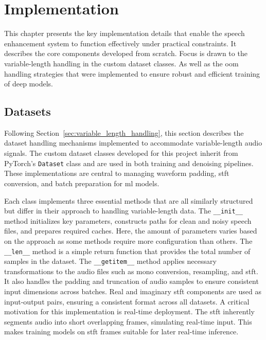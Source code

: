 \graphicspath{{content/chapters/6_implementation/figures/}}
\chapter{Implementation}
\label{chp:implementation}

This chapter presents the key implementation details that enable the speech enhancement system to function effectively under practical constraints. It describes the core components developed from scratch. Focus is drawn to the variable-length handling in the custom dataset classes. As well as the \gls{oom} handling strategies that were implemented to ensure robust and efficient training of deep models. 

\section{Datasets}
\label{sec:datasets}

Following Section~\ref{sec:variable_length_handling}, this section describes the dataset handling mechanisms implemented to accommodate variable-length audio signals. The custom dataset classes developed for this project inherit from PyTorch’s \texttt{Dataset} class and are used in both training and denoising pipelines. These implementations are central to managing waveform padding, \gls{stft} conversion, and batch preparation for \gls{ml} models.

Each class implements three essential methods that are all similarly structured but differ in their approach to handling variable-length data. The \texttt{\_\_init\_\_} method initializes key parameters, constructs paths for clean and noisy speech files, and prepares required caches. Here, the amount of parameters varies based on the approach as some methods require more configuration than others. The \texttt{\_\_len\_\_} method is a simple return function that provides the total number of samples in the dataset. The \texttt{\_\_getitem\_\_} method applies necessary transformations to the audio files such as mono conversion, resampling, and \gls{stft}. It also handles the padding and truncation of audio samples to ensure consistent input dimensions across batches. Real and imaginary \gls{stft} components are used as input-output pairs, ensuring a consistent format across all datasets. A critical motivation for this implementation is real-time deployment. The \gls{stft} inherently segments audio into short overlapping frames, simulating real-time input. This makes training models on \gls{stft} frames suitable for later real-time inference.

